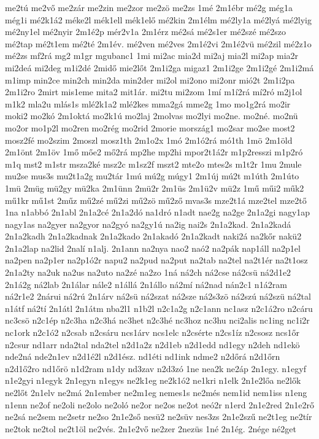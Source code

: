 {me2tú
me2vő
me2zár
me2zin
me2zor
me2zö
me2zs
1mé
2m1ébr
mé2g
még1a
még1i
mé2k1á2
méke2l
mék1ell
mék1elő
mé2kin
2m1élm
mé2ly1a
mé2lyá
mé2lyig
mé2ny1el
mé2nyir
2m1é2p
mér2v1a
2m1érz
mé2sá
mé2s1er
mé2szé
mé2szo
mé2tap
mé2t1em
mé2té
2m1év.
mé2ven
mé2ves
2m1é2vi
2m1é2vü
mé2zil
mé2z1o
mé2zs
mf2rá
mg2
m1gr
mgubanc1
1mi
mi2ac
mia2d
mi2aj
mia2l
mi2ap
mia2r
mi2deá
mi2deg
m1i2dé
2midő
mie2lőt
2m1i2ga
migaz1
2m1i2ge
2m1i2gé
2m1i2má
m1imp
min2ce
min2ch
min2da
min2der
mi2ol
mi2ono
mi2onr
mió2t
2m1i2pa
2m1i2ro
2mirt
mis1eme
mita2
mit1ár.
mi2tu
mi2zom
1mí
m1í2rá
mí2ró
m2j1ol
m1k2
mla2u
mlás1s
mlé2k1a2
mlé2kes
mma2gá
mme2g
1mo
mo1g2rá
mo2ir
moki2
mo2kó
2m1oktá
mo2k1ú
mo2laj
2molvas
mo2lyi
mo2ne.
mo2né.
mo2nü
mo2or
mo1p2l
mo2ren
mo2rég
mo2rid
2morie
mország1
mo2sar
mo2se
most2
mosz2fé
mo2szim
2moszl
mosz1th
2m1o2x
1mó
2m1ó2rá
mó1th
1mö
2m1öld
2m1önt
2m1öv
1mő
mőe2
mő2rá
mp2he
mp2hi
mpor2t1á2r
m1p2resszi
m1p2ró
m1q
mst2
m1str
msza2ké
msz2c
m1sz2f
mszt2
mte2o
mtes2s
m1t2r
1mu
2mule
mu2se
mus3s
mu2t1a2g
mu2tár
1mú
mú2g
múgy1
2m1új
mú2t
m1úth
2m1úto
1mü
2müg
mü2gy
mü2ka
2m1ünn
2mü2r
2m1üs
2m1ü2v
mü2z
1mű
műi2
műk2
mű1kr
mű1st
2műz
mű2zé
mű2zi
mű2zö
mű2ző
mvas3s
mze2t1á
mze2tel
mze2tő
1na
n1abbó
2n1abl
2n1a2cé
2n1a2dó
na1dró
n1adt
nae2g
na2ge
2n1a2gi
nagy1ap
nagy1as
na2gyer
na2gyor
na2gyó
na2gy1ú
na2ig
nai2s
2n1a2kad.
2n1a2kadá
2n1a2kadh
2n1a2kadnak
2n1a2kado
2n1akadó
2n1a2kadt
naki2á
na2kőr
nakü2
2n1a2lap
na2lid
2nalí
n1alj.
2n1ann
na2nya
nao2
naó2
na2pák
nap1áll
na2p1el
na2pen
na2p1er
na2p1ó2r
napu2
na2pud
na2put
na2tab
na2tel
na2t1ér
na2t1osz
2n1a2ty
na2uk
na2us
na2uto
na2zé
na2zo
1ná
ná2ch
ná2cse
ná2csü
ná2d1e2
2n1á2g
ná2lab
2n1álar
nále2
n1állá
2n1állo
ná2mí
ná2nad
nán2c1
n1á2ram
ná2r1e2
2nárui
ná2rú
2n1árv
ná2sü
ná2szat
ná2sze
ná2s3zö
ná2szú
ná2szü
ná2tal
n1átf
ná2tí
2n1átl
2n1átm
nba2l1
n1b2l
n2c1a2g
n2c1ann
nc1asz
n2c1á2ro
n2cáru
nc3csö
n2c1ép
n2c3ha
n2c3há
nc3het
n2c3hé
nc3hoz
nc3hu
nci2alis
nc1ing
nc1i2r
nc1ork
n2c1ó2
n2csab
n2csáru
ncs1árv
ncs1elc
n2csérte
n2cs1íz
n2csosz
ncs1őr
n2csur
nd1arr
nda2tal
nda2tel
n2d1a2z
n2d1eb
n2d1edd
nd1egy
n2deh
nd1ekö
nde2ná
nde2n1ev
n2d1é2l
n2d1ész.
nd1éti
nd1ink
ndme2
n2dőrá
n2d1őrn
n2d1ő2ro
nd1őrö
n1d2ram
n1dy
nd3zav
n2d3zó
1ne
nea2k
ne2áp
2n1egy.
n1egyf
n1e2gyi
n1egyk
2n1egyn
n1egys
ne2k1eg
ne2k1ó2
ne1kri
n1elk
2n1e2lőa
ne2lők
ne2lőt
2n1elv
ne2má
2n1ember
ne2m1eg
nemes1s
ne2més
nem1id
nem1iss
n1eng
n1enn
ne2of
ne2oli
ne2olo
ne2oló
ne2or
ne2os
ne2ot
neó2r
n1erd
2n1e2red
2n1e2rő
ne2sá
ne2sem
ne2setr
ne2so
2n1e2ső
nesü2
ne2süv
nes3zs
2n1e2szű
ne2t1eg
ne2tír
ne2tok
ne2tol
ne2t1öl
ne2vés.
2n1e2vő
ne2zer
2nezüs
1né
2n1ég.
2nége
né2get
}
